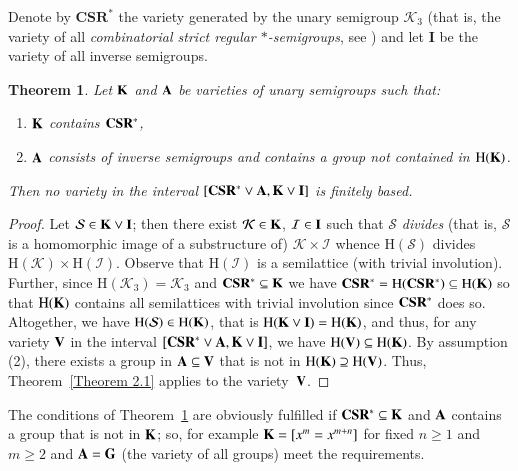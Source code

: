 \documentclass[preprint,1p,times]{elsarticle}
\numberwithin{equation}{section}
\newtheorem{Thm}{Theorem}[section]
\theoremstyle{remark}
\def\pv#1{{\bf #1}}
\def\H{\mathrm H}
\begin{document}
Denote by $\mathbf{CSR^*}$ the variety generated by the unary semigroup $\mathcal{K}_3$ (that is, the variety of all
\emph{combinatorial strict regular $*$-semigroups}, see \cite{A1}) and let $\mathbf{I}$ be the variety of all inverse
semigroups.
\begin{Thm}
\label{Theorem 3.2} Let $\pv K$ and $\pv A$ be varieties of unary semigroups such that:
\begin{enumerate}
\item $\pv K$ contains $\pv{CSR^*}$,
\item $\pv A$ consists of inverse semigroups and contains
a group not contained in $\H(\pv K)$.
\end{enumerate}
Then no variety in the interval $[\pv{CSR^*}\vee \pv A, \pv K\vee\pv{I}]$ is finitely based.
\end{Thm}

\begin{proof}
Let $\mathcal{S}\in \pv K\vee\pv I$; then there exist $\mathcal{K}\in \pv K$, $\mathcal{I}\in \pv I$ such that
$\mathcal{S}$ \emph{divides} (that is, $\mathcal{S}$ is a homomorphic image of a substructure of)
$\mathcal{K}\times\mathcal{I}$ whence $\H(\mathcal{S})$ divides $\H(\mathcal{K})\times \H(\mathcal{I})$. Observe that
$\H(\mathcal{I})$ is a semilattice (with trivial involution). Further, since $\H(\mathcal{K}_3)=\mathcal{K}_3$ and $\pv
{CSR^*}\subseteq \pv K$ we have $\pv{CSR^*}=\H(\pv{CSR^*})\subseteq \H (\pv K)$ so that $\H (\pv K)$ contains all
semilattices with trivial involution since $\pv{CSR^*}$ does so. Altogether, we have $\H(\mathcal{S})\in \H(\pv K)$,
that is $\H(\pv K\vee\pv I)=\H(\pv K)$, and thus, for any variety $\pv V$ in the interval $[\pv{CSR^*}\vee \pv A, \pv
K\vee\pv{I}]$, we have $\H(\pv V)\subseteq \H(\pv K)$. By assumption (2), there exists a group in $\pv A\subseteq \pv
V$ that is not in $\H(\pv K)\supseteq \H(\pv V)$. Thus, Theorem~\ref{Theorem 2.1} applies to the variety~$\pv V$.
\end{proof}

The conditions of Theorem~\ref{Theorem 3.2} are obviously fulfilled if $\pv{CSR^*}\subseteq \pv K$ and $\pv A$ contains
a group that is not in $\pv K$; so, for example $\pv K=[x^m=x^{m+n}]$ for fixed $n\ge 1$ and $m\ge 2$ and $\pv A=\pv G$
(the variety of all groups) meet the requirements.
\end{document}
